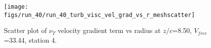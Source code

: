 \begin{figure}[H]
\centering
\texttt{[image: figs/run\_40/run\_40\_turb\_visc\_vel\_grad\_vs\_r\_meshscatter]}
\caption{Scatter plot of $\nu_T$ velocity gradient term vs radius at $z/c$=8.50, $V_{free}$=33.44, station 4.}
\label{fig:run_40_turb_visc_vel_grad_vs_r_meshscatter}
\end{figure}


